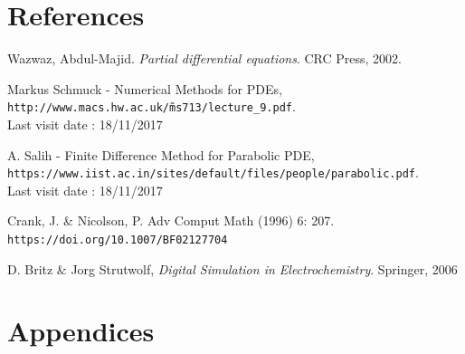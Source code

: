\documentclass{article}
\begin{document}
    \section{References}
    \begin{thebibliography}{9}
        Wazwaz, Abdul-Majid. \textit{Partial differential equations}. CRC Press, 2002.

        Markus Schmuck - Numerical Methods for PDEs,
        \\\texttt{http://www.macs.hw.ac.uk/\~ms713/lecture\_9.pdf}.
        \\Last visit date : 18/11/2017

        A. Salih - Finite Difference Method for Parabolic PDE,
        \\\texttt{https://www.iist.ac.in/sites/default/files/people/parabolic.pdf}.
        \\Last visit date : 18/11/2017

        
        Crank, J. & Nicolson, P. Adv Comput Math (1996) 6: 207. 
        \\\texttt{https://doi.org/10.1007/BF02127704}

        D. Britz \& Jorg Strutwolf, \textit{Digital Simulation in Electrochemistry}.
        Springer, 2006

        
        
    \end{thebibliography}
    \newpage
    \section{Appendices}
\end{document}
